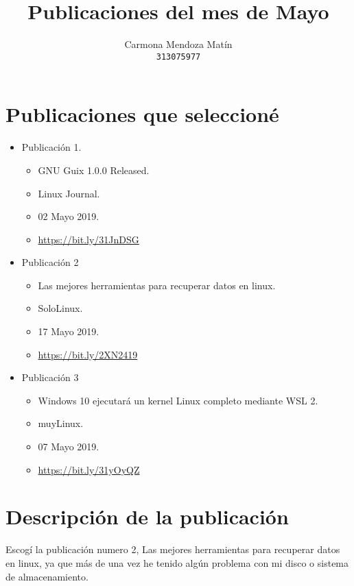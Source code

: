 \documentclass[11pt, a4paper]{report}
\begin{document}
\title{Publicaciones del mes de Mayo}
\author{
  Carmona Mendoza Mat\'in\\
  \texttt{313075977}
}
\date{}
\maketitle

\section*{Publicaciones que seleccioné}
\begin{itemize}

\item Publicación 1.
  \begin{itemize}
  \item GNU Guix 1.0.0 Released.
  \item Linux Journal.
  \item 02 Mayo 2019.
  \item \url{https://bit.ly/31JnDSG}
  \end{itemize}
  
\item Publicación 2
  \begin{itemize}
  \item Las mejores herramientas para recuperar datos en linux.
  \item SoloLinux.
  \item 17 Mayo 2019. 
  \item \url{https://bit.ly/2XN2419}
  \end{itemize}

\item Publicación 3
  \begin{itemize}
  \item Windows 10 ejecutará un kernel Linux completo mediante WSL 2.
  \item muyLinux.
  \item 07 Mayo 2019.
  \item \url{https://bit.ly/31yOyQZ}
  \end{itemize}
\end{itemize}  

\section*{Descripción de la publicación}
Escogí la publicación numero 2, Las mejores herramientas para recuperar datos
en linux, ya que más de una vez he tenido algún problema con mi disco o sistema
de almacenamiento. \\
\end{document}
